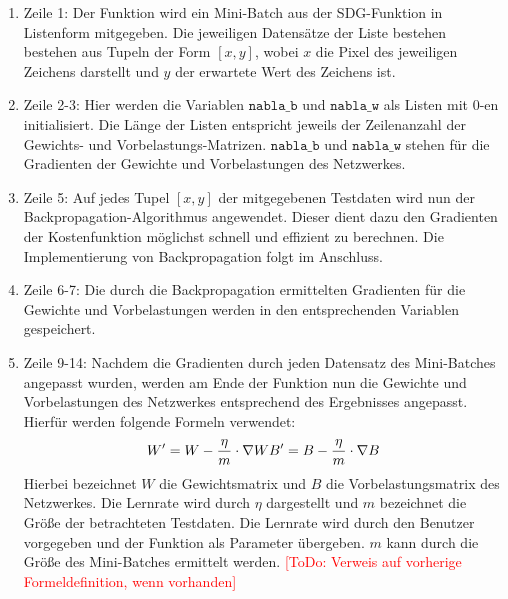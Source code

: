 \begin{enumerate}
\item Zeile 1: Der Funktion wird ein Mini-Batch aus der SDG-Funktion in Listenform mitgegeben. Die jeweiligen Datensätze der Liste bestehen bestehen aus Tupeln der Form $[x,y]$, wobei $x$ die Pixel des jeweiligen Zeichens darstellt und $y$ der erwartete Wert des Zeichens ist.
\item Zeile 2-3: Hier werden die Variablen $\mathtt{nabla\_b}$ und $\mathtt{nabla\_w}$ als Listen mit 0-en initialisiert. Die Länge der Listen entspricht jeweils der Zeilenanzahl der Gewichts- und Vorbelastungs-Matrizen. $\mathtt{nabla\_b}$ und $\mathtt{nabla\_w}$ stehen für die Gradienten der Gewichte und Vorbelastungen des Netzwerkes.
\item Zeile 5: Auf jedes Tupel $[x,y]$ der mitgegebenen Testdaten wird nun der Backpropagation-Algorithmus angewendet. Dieser dient dazu den Gradienten der Kostenfunktion möglichst schnell und effizient zu berechnen. Die Implementierung von Backpropagation folgt im Anschluss.
\item Zeile 6-7: Die durch die Backpropagation ermittelten Gradienten für die Gewichte und Vorbelastungen werden in den entsprechenden Variablen gespeichert.
\item Zeile 9-14: Nachdem die Gradienten durch jeden Datensatz des Mini-Batches angepasst wurden, werden am Ende der Funktion nun die Gewichte und Vorbelastungen des Netzwerkes entsprechend des Ergebnisses angepasst. Hierfür werden folgende Formeln verwendet:
\begin{equation}
	W' = W - \frac{\eta}{m}\cdot \nabla W \\
	B' = B - \frac{\eta}{m}\cdot \nabla B
\end{equation}
Hierbei bezeichnet $W$ die Gewichtsmatrix und $B$ die Vorbelastungsmatrix des Netzwerkes. Die Lernrate wird durch $\eta$ dargestellt und $m$ bezeichnet die Größe der betrachteten Testdaten. Die Lernrate wird durch den Benutzer vorgegeben und der Funktion als Parameter übergeben. $m$ kann durch die Größe des Mini-Batches ermittelt werden. \textcolor{red}{[ToDo: Verweis auf vorherige Formeldefinition, wenn vorhanden]}
\end{enumerate}

